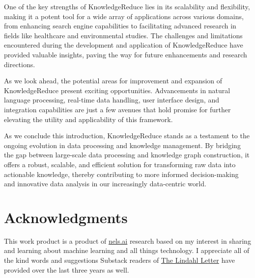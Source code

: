 \documentclass{article}
\begin{document}
One of the key strengths of KnowledgeReduce lies in its scalability and flexibility, making it a potent tool for a wide array of applications across various domains, from enhancing search engine capabilities to facilitating advanced research in fields like healthcare and environmental studies. The challenges and limitations encountered during the development and application of KnowledgeReduce have provided valuable insights, paving the way for future enhancements and research directions.

As we look ahead, the potential areas for improvement and expansion of KnowledgeReduce present exciting opportunities. Advancements in natural language processing, real-time data handling, user interface design, and integration capabilities are just a few avenues that hold promise for further elevating the utility and applicability of this framework.

As we conclude this introduction, KnowledgeReduce stands as a testament to the ongoing evolution in data processing and knowledge management. By bridging the gap between large-scale data processing and knowledge graph construction, it offers a robust, scalable, and efficient solution for transforming raw data into actionable knowledge, thereby contributing to more informed decision-making and innovative data analysis in our increasingly data-centric world.

\section*{Acknowledgments}
This work product is a product of \href{https://www.nels.ai/}{nels.ai} research based on my interest in sharing and learning about machine learning and all things technology. I appreciate all of the kind words and suggestions Substack readers of \href{https://nelslindahl.substack.com/}{The Lindahl Letter} have provided over the last three years as well. 

  
  
\end{document}
